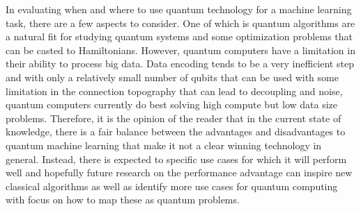 \documentclass[
	a4paper, %
	10pt, %
	unnumberedsections, %
	twoside, %
]{LTJournalArticle}
\begin{document}
In evaluating when and where to use quantum technology for a machine learning task, there are a few aspects to consider. One of which is quantum algorithms are a natural fit for studying quantum 
systems and some optimization problems that can be casted to Hamiltonians. However, quantum computers have a limitation in their ability to process big data. Data encoding tends to be a very 
inefficient step and with only a relatively small number of qubits that can be used with some limitation in the connection topography that can lead to decoupling and noise, quantum computers 
currently do best solving high compute but low data size problems. Therefore, it is the opinion of the reader that in the current state of knowledge, there is a fair balance between the advantages 
and disadvantages to quantum machine learning that make it not a clear winning technology in general. Instead, there is expected to specific use cases for which it will perform well and hopefully 
future research on the performance advantage can inspire new classical algorithms as well as identify more use cases for quantum computing with focus on how to map these as quantum problems. 

\printbibliography %
\end{document}
